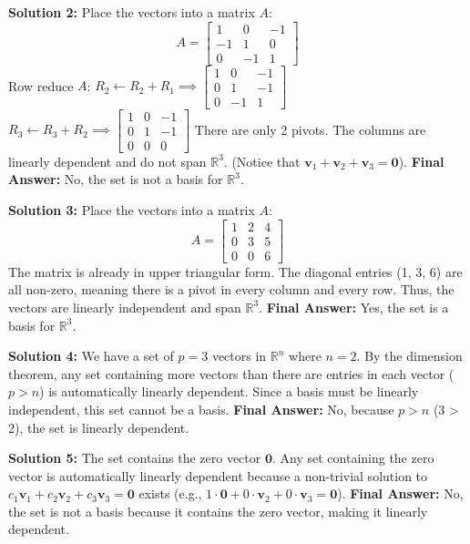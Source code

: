 \documentclass[11pt]{article}
\begin{document}
\vspace{0.5cm}
\textbf{Solution 2:}
Place the vectors into a matrix $A$:
$$ A = \begin{bmatrix} 1 & 0 & -1 \\ -1 & 1 & 0 \\ 0 & -1 & 1 \end{bmatrix} $$
Row reduce $A$:
$R_2 \leftarrow R_2 + R_1 \implies \begin{bmatrix} 1 & 0 & -1 \\ 0 & 1 & -1 \\ 0 & -1 & 1 \end{bmatrix}$
$R_3 \leftarrow R_3 + R_2 \implies \begin{bmatrix} 1 & 0 & -1 \\ 0 & 1 & -1 \\ 0 & 0 & 0 \end{bmatrix}$
There are only 2 pivots. The columns are linearly dependent and do not span $\mathbb{R}^3$. (Notice that $\mathbf{v}_1 + \mathbf{v}_2 + \mathbf{v}_3 = \mathbf{0}$).
\textbf{Final Answer:} No, the set is not a basis for $\mathbb{R}^3$.

\vspace{0.5cm}
\textbf{Solution 3:}
Place the vectors into a matrix $A$:
$$ A = \begin{bmatrix} 1 & 2 & 4 \\ 0 & 3 & 5 \\ 0 & 0 & 6 \end{bmatrix} $$
The matrix is already in upper triangular form. The diagonal entries (1, 3, 6) are all non-zero, meaning there is a pivot in every column and every row. Thus, the vectors are linearly independent and span $\mathbb{R}^3$.
\textbf{Final Answer:} Yes, the set is a basis for $\mathbb{R}^3$.

\vspace{0.5cm}
\textbf{Solution 4:}
We have a set of $p=3$ vectors in $\mathbb{R}^n$ where $n=2$. By the dimension theorem, any set containing more vectors than there are entries in each vector ($p > n$) is automatically linearly dependent. Since a basis must be linearly independent, this set cannot be a basis.
\textbf{Final Answer:} No, because $p > n$ (3 > 2), the set is linearly dependent.

\vspace{0.5cm}
\textbf{Solution 5:}
The set contains the zero vector $\mathbf{0}$. Any set containing the zero vector is automatically linearly dependent because a non-trivial solution to $c_1\mathbf{v}_1 + c_2\mathbf{v}_2 + c_3\mathbf{v}_3 = \mathbf{0}$ exists (e.g., $1\cdot\mathbf{0} + 0\cdot\mathbf{v}_2 + 0\cdot\mathbf{v}_3 = \mathbf{0}$).
\textbf{Final Answer:} No, the set is not a basis because it contains the zero vector, making it linearly dependent.
\end{document}
